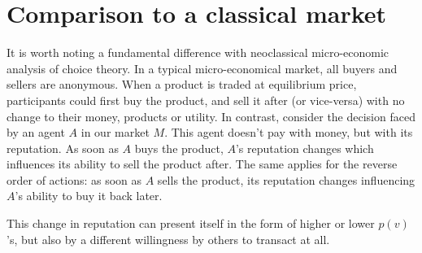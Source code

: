 \section{Comparison to a classical market}
It is worth noting a fundamental difference with neoclassical micro-economic analysis of choice theory. In a typical micro-economical market, all buyers and sellers are anonymous. When a product is traded at equilibrium price, participants could first buy the product, and sell it after (or vice-versa) with no change to their money, products or utility. In contrast, consider the decision faced by an agent $A$ in our market $M$. This agent doesn't pay with money, but with its reputation. As soon as $A$ buys the product, $A$'s reputation changes which influences its ability to sell the product after. The same applies for the reverse order of actions: as soon as $A$ sells the product, its reputation changes influencing $A$'s ability to buy it back later.

This change in reputation can present itself in the form of higher or lower $p(v)$'s, but also by a different willingness by others to transact at all.
